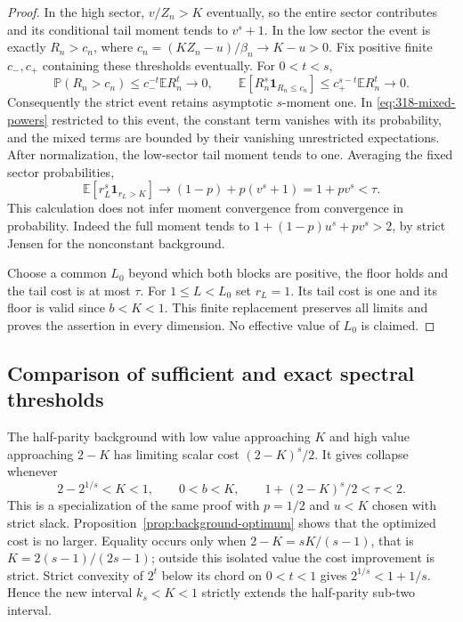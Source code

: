 \documentclass[11pt]{article}
\begin{document}
\begin{proof}
In the high sector, $v/Z_n>K$ eventually, so the entire sector
contributes and its conditional tail moment tends to $v^s+1$.
In the low sector the event is exactly $R_n>c_n$, where
$c_n=(KZ_n-u)/\beta_n\to K-u>0$. Fix positive finite
$c_-,c_+$ containing these thresholds eventually. For $0<t<s$,
\[
 \mathbb P(R_n>c_n)\le c_-^{-t}\mathbb ER_n^t\to0,
 \qquad
 \mathbb E[R_n^s\mathbf1_{R_n\le c_n}]
 \le c_+^{s-t}\mathbb ER_n^t\to0.
\]
Consequently the strict event retains asymptotic $s$-moment one.
In \eqref{eq:318-mixed-powers} restricted to this event, the constant term vanishes with
its probability, and the mixed terms are bounded by their vanishing
unrestricted expectations. After normalization, the low-sector
tail moment tends to one. Averaging the fixed sector probabilities,
\[
 \mathbb E[r_L^s\mathbf1_{r_L>K}]
 \longrightarrow (1-p)+p(v^s+1)=1+pv^s<\tau.
\]
This calculation does not infer moment convergence from convergence
in probability. Indeed the full moment tends to
$1+(1-p)u^s+pv^s>2$, by strict Jensen for the nonconstant background.

Choose a common $L_0$ beyond which both blocks are positive, the
floor holds and the tail cost is at most $\tau$. For $1\le L<L_0$
set $r_L=1$. Its tail cost is one and its floor is valid since
$b<K<1$. This finite replacement preserves all limits and proves
the assertion in every dimension. No effective value of $L_0$ is claimed.
\end{proof}

\subsection*{Comparison of sufficient and exact spectral thresholds}
The half-parity background with low value approaching $K$ and high
value approaching $2-K$ has limiting scalar cost $(2-K)^s/2$.
It gives collapse whenever
\[
 2-2^{1/s}<K<1,\qquad 0<b<K,\qquad
 1+(2-K)^s/2<\tau<2.
\]
This is a specialization of the same proof with $p=1/2$ and
$u<K$ chosen with strict slack. Proposition~\ref{prop:background-optimum}
shows that the optimized cost is no larger. Equality occurs only
when $2-K=sK/(s-1)$, that is $K=2(s-1)/(2s-1)$; outside this
isolated value the cost improvement is strict. Strict convexity
of $2^t$ below its chord on $0<t<1$ gives
$2^{1/s}<1+1/s$. Hence the new interval $k_s<K<1$ strictly
extends the half-parity sub-two interval.
\end{document}

